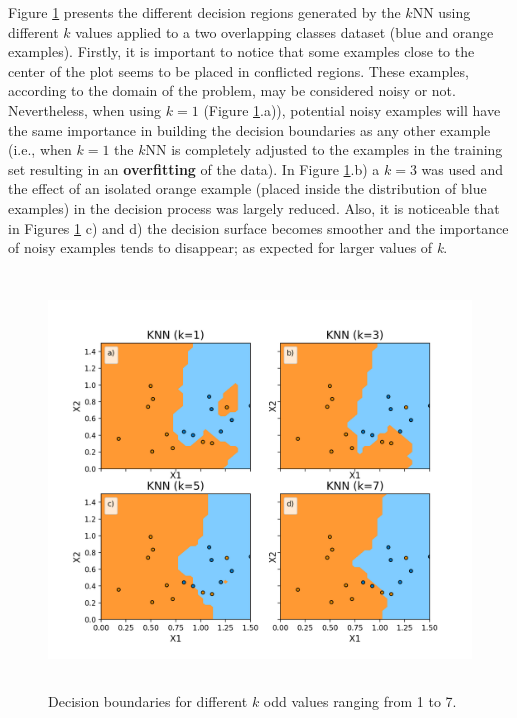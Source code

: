 Figure \ref{fig:decisionboundaries} presents the different decision regions generated by the $k$NN using different $k$ values applied to a two overlapping classes dataset (blue and orange examples). Firstly, it is important to notice that some examples close to the center of the plot seems to be placed in conflicted regions. These examples, according to the domain of the problem, may be considered noisy or not. Nevertheless, when using $k = 1$ (Figure \ref{fig:decisionboundaries}.a)), potential noisy examples will have the same importance in building the decision boundaries as any other example (i.e., when $k = 1$ the $k$NN is completely adjusted to the examples in the training set resulting in an \textbf{overfitting} of the data). In Figure \ref{fig:decisionboundaries}.b) a $k = 3$ was used and the effect of an isolated orange example (placed inside the distribution of blue examples) in the decision process was largely reduced. Also, it is noticeable that in Figures \ref{fig:decisionboundaries} c) and d) the decision surface becomes smoother and the importance of noisy examples tends to disappear; as expected for larger values of \textit{k}. 

\begin{figure}[h]
    \centering
    \includegraphics[height = 11cm, width =  14cm]{"Part 3 - Learning Systems/Supervised Learning/k-Nearest Neighbors/figures/decision_boundaries2.png"}
    \caption{Decision boundaries for different $k$ odd values ranging from 1 to 7.}
    \label{fig:decisionboundaries}
\end{figure}

